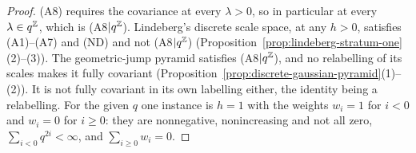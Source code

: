 \begin{proof}
\leanok
{}
(A8) requires the covariance at every $\lambda > 0$, so in particular at every $\lambda \in q^{\mathbb{Z}}$,
which is (A8$|q^{\mathbb{Z}}$). Lindeberg's discrete scale space, at any $h > 0$, satisfies (A1)--(A7)
and (ND) and not (A8$|q^{\mathbb{Z}}$) (Proposition~\ref{prop:lindeberg-stratum-one}(2)--(3)). The
geometric-jump pyramid satisfies (A8$|q^{\mathbb{Z}}$), and no relabelling of its scales makes it fully
covariant (Proposition~\ref{prop:discrete-gaussian-pyramid}(1)--(2)). It is not fully covariant in
its own labelling either, the identity being a relabelling. For the given $q$ one instance is
$h = 1$ with the weights $w_i = 1$ for $i < 0$ and $w_i = 0$ for $i \ge 0$: they are nonnegative,
nonincreasing and not all zero, $\sum_{i<0}q^{2i} < \infty$, and $\sum_{i \ge 0}w_i = 0$.
\end{proof}

